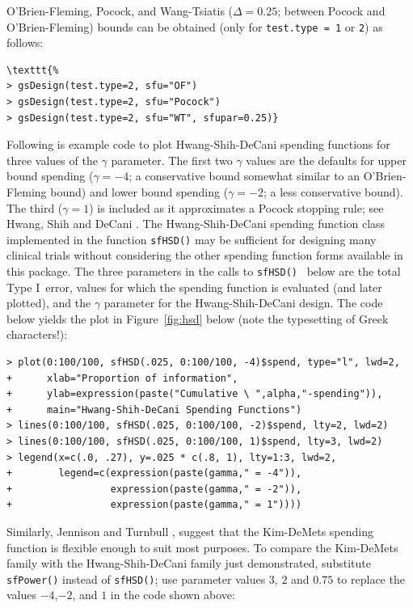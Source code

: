 O'Brien-Fleming, Pocock, and Wang-Tsiatis ($\Delta = 0.25$; between Pocock and
O'Brien-Fleming) bounds can be obtained (only for \texttt{test.type = 1} or 
\texttt{2}) as follows:

\bigskip
\begin{verbatim}
\texttt{%
> gsDesign(test.type=2, sfu="OF")
> gsDesign(test.type=2, sfu="Pocock")
> gsDesign(test.type=2, sfu="WT", sfupar=0.25)}
\end{verbatim}
\bigskip 
Following is example code to plot Hwang-Shih-DeCani spending
functions for three values of the $\gamma$ parameter. The first two $\gamma$
values are the defaults for upper bound spending ($\gamma = -4$; a conservative
bound somewhat similar to an O'Brien-Fleming bound) and lower bound spending
($\gamma = -2$; a less conservative bound). The third ($\gamma = 1$) is
included as it approximates a Pocock stopping rule; see Hwang, Shih and DeCani
\cite{HwangShihDeCani}. The Hwang-Shih-DeCani spending function class
implemented in the function \texttt{sfHSD()} may be sufficient for designing
many clinical trials without considering the other spending function forms
available in this package. The three parameters in the calls to 
\texttt{sfHSD()}%
\ below are the total Type I\ error, values for which the spending function is
evaluated (and later plotted), and the $\gamma$ parameter for the
Hwang-Shih-DeCani design. 
The code
below yields the plot in Figure~\ref{fig:hsd} below (note the typesetting of Greek characters!):

\bigskip

\begin{verbatim}
> plot(0:100/100, sfHSD(.025, 0:100/100, -4)$spend, type="l", lwd=2,
+      xlab="Proportion of information",
+      ylab=expression(paste("Cumulative \ ",alpha,"-spending")),
+      main="Hwang-Shih-DeCani Spending Functions")
> lines(0:100/100, sfHSD(.025, 0:100/100, -2)$spend, lty=2, lwd=2)
> lines(0:100/100, sfHSD(.025, 0:100/100, 1)$spend, lty=3, lwd=2)
> legend(x=c(.0, .27), y=.025 * c(.8, 1), lty=1:3, lwd=2,
+        legend=c(expression(paste(gamma," = -4")),
+                 expression(paste(gamma," = -2")),
+                 expression(paste(gamma," = 1"))))
\end{verbatim}
\bigskip

Similarly, Jennison and Turnbull \cite{JTBook},
suggest that the Kim-DeMets spending function is flexible enough to suit most
purposes. To compare the Kim-DeMets family with the Hwang-Shih-DeCani family
just demonstrated, substitute \texttt{sfPower()} instead of
\texttt{sfHSD()}; use parameter values $3$, $2$ and $0.75$ to 
replace the values $-4$,$-2$, and $1$ in the code shown above: 

